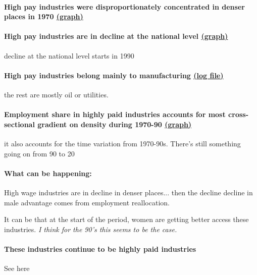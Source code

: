 \paragraph{High pay industries were disproportionately concentrated in denser places in 1970 \href{https://www.dropbox.com/s/dwse5a96c5xl2xx/high_pay_ind_density_full_time.png?dl=0}{(graph)}}

\paragraph{High pay industries are in decline at the national level \href{https://www.dropbox.com/s/nwr1ozinncqehnh/employment_share_quartile_by_year_full_time.png?dl=0}{(graph)}} decline at the national level starts in 1990


\paragraph{High pay industries belong mainly to manufacturing \href{https://www.dropbox.com/s/kle6o99of1zxtlo/high_pay_industries.txt?dl=0}{(log file)}} the rest are mostly oil or utilities.

\paragraph{Employment share in highly paid industries accounts for most cross-sectional gradient on density during 1970-90 \href{https://www.dropbox.com/s/qgp2oos8g379e36/controlling_high_wage_industries_full_time.png?dl=0}{(graph)}} it also accounts for the time variation from 1970-90s. There's still something going on from 90 to 20

\paragraph{What can be happening:}
\bitem
	\item High wage industries are in decline in denser places... then the decline decline in male advantage comes from employment reallocation.
	\item It can be that at the start of the period, women are getting better access these industries. \textit{I think for the 90's this seems to be the case.}
\eitem



\paragraph{These industries continue to be highly paid industries}
See here






